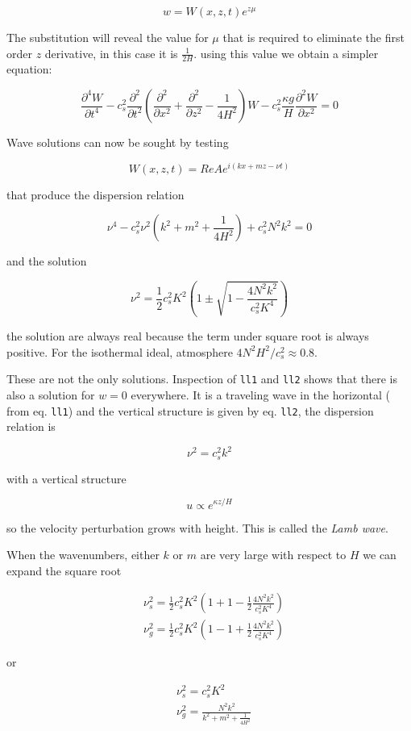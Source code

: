 \[w = W(x,z,t) e^{z\mu}\]

The substitution will reveal the value for \(\mu\) that is required to
eliminate the first order \(z\) derivative, in this case it is
\(\frac{1}{2H}\). using this value we obtain a simpler equation:

\[\frac{\partial^4 W}{\partial t^4} -c_s^2\frac{\partial^{2} }{\partial t^{2}} \left(\frac{\partial^{2} }{\partial x^{2}} +\frac{\partial^{2} }{\partial z^{2}} -\frac{1}{4H^2}\right)W  -c_s^2 \frac{\kappa g}{H}\frac{\partial^{2} W}{\partial x^{2}} = 0\]

Wave solutions can now be sought by testing

\[W(x,z,t) = Re Ae^{i(kx+mz-\nu t)}\]

that produce the dispersion relation

\[\nu^4 -c_s^2\nu^2\left(k^2+m^2+\frac{1}{4H^2}\right) + c_s^2  N^2 k^2 = 0\]

and the solution

{\[\nu^2 = \frac{1}{2}c_s^2K^2 \left( 1 \pm \sqrt{ 1 - \frac{4N^2k^2}{c_s^2K^4}}\right)\]}

the solution are always real because the term under square root is
always positive. For the isothermal ideal, atmosphere
\(4N^2H^2/c_s^2 \approx 0.8\).

These are not the only solutions. Inspection of \texttt{ll1} and
\texttt{ll2} shows that there is also a solution for \(w=0\) everywhere.
It is a traveling wave in the horizontal ( from eq. \texttt{ll1}) and
the vertical structure is given by eq. \texttt{ll2}, the dispersion
relation is

\[\nu^2 = c_s^2 k^2\]

with a vertical structure

\[u \propto e^{\kappa z/H}\]

so the velocity perturbation grows with height. This is called the
\emph{Lamb wave}.

When the wavenumbers, either \(k\) or \(m\) are very large with respect
to \(H\) we can expand the square root

\[\begin{aligned}
&\nu^2_s = \frac{1}{2}c_s^2K^2 \left( 1 + 1 - \frac{1}{2}\frac{4N^2k^2}{c_s^2K^4}\right)\\
&\nu^2_g = \frac{1}{2}c_s^2K^2 \left( 1 - 1 + \frac{1}{2}\frac{4N^2k^2}{c_s^2K^4}\right)
\end{aligned}\]

or

\[\begin{aligned}
&\nu^2_s = c_s^2K^2 \\
&\nu^2_g =  \frac{N^2k^2}{k^2+m^2+\frac{1}{4H^2}}
\end{aligned}\]

